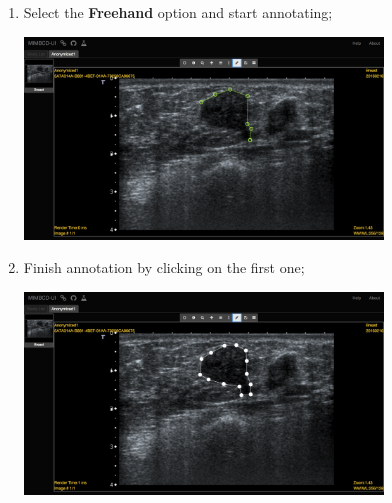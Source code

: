 \documentclass{tufte-book} %
\begin{document}
\begin{enumerate}

\item Select the \textbf{Freehand} option and start annotating;

\begin{center}
\includegraphics[width=0.75\textwidth]{graphics/anon1_annotations_start.png}
\end{center}

\item Finish annotation by clicking on the first one;

\begin{center}
\includegraphics[width=0.75\textwidth]{graphics/anon1_annotations_finish.png}
\end{center}

\end{enumerate}



\printindex
\end{document}
